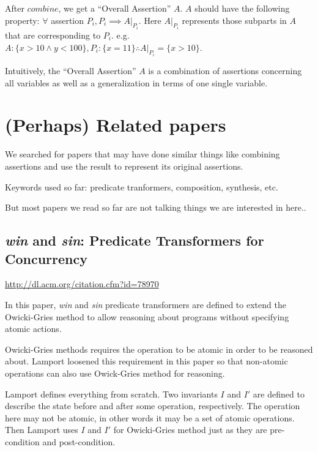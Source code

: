 \documentclass[fleqn]{article}
\begin{document}
\bigskip

After $combine$, we get a ``Overall Assertion'' $A$. $A$ should have
the following property: $\forall$ assertion $P_i, P_i \implies
A|_{P_i}$.  Here $A|_{P_i}$ represents those subparts in $A$ that are
corresponding to $P_i$. e.g. $A: \{x > 10 \land y < 100\}, P_i: \{x =
11\} \therefore A|_{P_i} = \{x > 10\}$.

Intuitively, the ``Overall Assertion'' $A$ is a combination of
assertions concerning all variables as well as a generalization in
terms of one single variable.


\section{(Perhaps) Related papers}

We searched for papers that may have done similar things like
combining assertions and use the result to represent its original
assertions.

Keywords used so far: predicate tranformers, composition, synthesis,
etc.

But most papers we read so far are not talking things we are
interested in here..

\subsection{\textsl{win} and \textsl{sin}: Predicate Transformers for Concurrency}

\url{http://dl.acm.org/citation.cfm?id=78970}

\bigskip

In this paper, \textsl{win} and \textsl{sin} predicate transformers
are defined to extend the Owicki-Gries method to allow reasoning about
programs without specifying atomic actions.

Owicki-Gries methods requires the operation to be atomic in order to
be reasoned about. Lamport loosened this requirement in this paper so
that non-atomic operations can also use Owick-Gries method for
reasoning.

Lamport defines everything from scratch. Two invariants $I$ and $I'$
are defined to describe the state before and after some operation,
respectively. The operation here may not be atomic, in other words it
may be a set of atomic operations. Then Lamport uses $I$ and $I'$ for
Owicki-Gries method just as they are pre-condition and post-condition.
\end{document}
